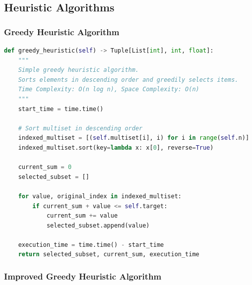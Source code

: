 \documentclass[12pt,a4paper]{article}
\begin{document}
\subsection{Heuristic Algorithms}

\subsubsection{Greedy Heuristic Algorithm}

\begin{lstlisting}[language=Python, caption=Greedy Heuristic Algorithm]
def greedy_heuristic(self) -> Tuple[List[int], int, float]:
    """
    Simple greedy heuristic algorithm.
    Sorts elements in descending order and greedily selects items.
    Time Complexity: O(n log n), Space Complexity: O(n)
    """
    start_time = time.time()

    # Sort multiset in descending order
    indexed_multiset = [(self.multiset[i], i) for i in range(self.n)]
    indexed_multiset.sort(key=lambda x: x[0], reverse=True)

    current_sum = 0
    selected_subset = []

    for value, original_index in indexed_multiset:
        if current_sum + value <= self.target:
            current_sum += value
            selected_subset.append(value)

    execution_time = time.time() - start_time
    return selected_subset, current_sum, execution_time
\end{lstlisting}

\subsubsection{Improved Greedy Heuristic Algorithm}
\end{document}

